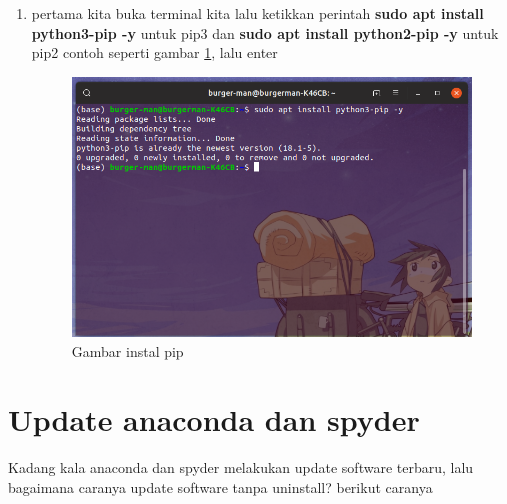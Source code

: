 \begin{enumerate}

\item pertama kita buka terminal kita lalu ketikkan perintah \textbf{sudo apt install python3-pip -y} untuk pip3 dan \textbf{sudo apt install python2-pip -y} untuk pip2 contoh seperti gambar \ref{installpip}, lalu enter
\begin{figure}[H]
\centering
\includegraphics[width=1\textwidth]{figures/installpip.png}
\caption{Gambar instal pip}
\label{installpip}
\end{figure}

\end{enumerate}

\section{Update anaconda dan spyder}
Kadang kala anaconda dan spyder melakukan update software terbaru, lalu bagaimana caranya update software tanpa uninstall? berikut caranya

